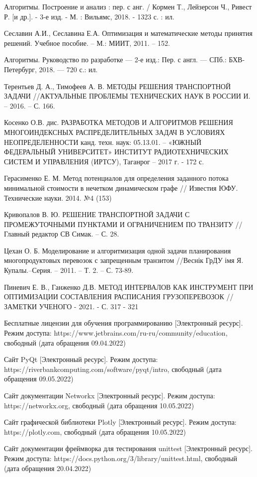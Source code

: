 \begin{thebibliography}{}
	  Алгоритмы. Построение и анализ : пер. с анг. / Кормен Т., Лейзерсон Ч., Ривест Р. [и др.]. - 3-е изд. - М. : Вильямс, 2018. - 1323 с. : ил.
	
	 Сеславин А.И., Сеславина Е.А. Оптимизация и математические методы принятия решений. Учебное пособие. – М.: МИИТ, 2011. – 152. 
	
	 Алгоритмы. Руководство по разработке --- 2-е изд.: Пер. с англ. --- СПб.: БХВ-Петербург, 2018. --- 720 с.: ил.
	
	 Терентьев Д. А., Тимофеев А. В. МЕТОДЫ РЕШЕНИЯ ТРАНСПОРТНОЙ ЗАДАЧИ //АКТУАЛЬНЫЕ ПРОБЛЕМЫ ТЕХНИЧЕСКИХ НАУК В РОССИИ И. – 2016. – С. 166.
	
	 Косенко О.В. дис. РАЗРАБОТКА МЕТОДОВ И АЛГОРИТМОВ РЕШЕНИЯ МНОГОИНДЕКСНЫХ РАСПРЕДЕЛИТЕЛЬНЫХ ЗАДАЧ В УСЛОВИЯХ НЕОПРЕДЕЛЕННОСТИ канд. техн. наук: 05.13.01. -- «ЮЖНЫЙ ФЕДЕРАЛЬНЫЙ УНИВЕРСИТЕТ» ИНСТИТУТ РАДИОТЕХНИЧЕСКИХ СИСТЕМ И УПРАВЛЕНИЯ (ИРТСУ), Таганрог -- 2017 г. - 172 с.
	
	 Герасименко Е. М. Метод потенциалов для определения заданного потока минимальной стоимости в нечетком динамическом графе // Известия ЮФУ. Технические науки. 2014. №4 (153)
	
	 Кривопалов В. Ю. РЕШЕНИЕ ТРАНСПОРТНОЙ ЗАДАЧИ С ПРОМЕЖУТОЧНЫМИ ПУНКТАМИ И ОГРАНИЧЕНИЕМ ПО ТРАНЗИТУ //Главный редактор СВ Симак. – С. 28.
	
	 Цехан О. Б. Моделирование и алгоритмизация одной задачи планирования многопродуктовых перевозок с запрещенным транзитом //Веснік ГрДУ імя Я. Купалы.–Серия. – 2011. – Т. 2. – С. 73-89.
	
	  Пиневич Е. В., Ганженко Д.В. МЕТОД ИНТЕРВАЛОВ КАК ИНСТРУМЕНТ ПРИ ОПТИМИЗАЦИИ СОСТАВЛЕНИЯ РАСПИСАНИЯ ГРУЗОПЕРЕВОЗОК // ЗАМЕТКИ УЧЕНОГО - 2021. - С. 317 - 321
	
	 Бесплатные лицензии для обучения программированию [Электронный ресурс]. Режим доступа: https://www.jetbrains.com/ru-ru/community/education, свободный (дата обращения 09.04.2022)
	
	 Сайт PyQt [Электронный ресурс]. Режим доступа: https://riverbankcomputing.com/software/pyqt/intro, свободный (дата обращения 09.05.2022)
	
	 Сайт документации Networkx [Электронный ресурс]. Режим доступа: https://networkx.org, свободный (дата обращения 10.05.2022)
	
	 Сайт графической библиотеки Plotly [Электронный ресурс]. Режим доступа: https://plotly.com, свободный (дата обращения 10.05.2022)
	
	 Сайт документации фреймворка для тестирования unittest [Электронный ресурс]. Режим доступа: https://docs.python.org/3/library/unittest.html, свободный (дата обращения 20.04.2022)
	
\end{thebibliography}
\endgroup

\pagebreak